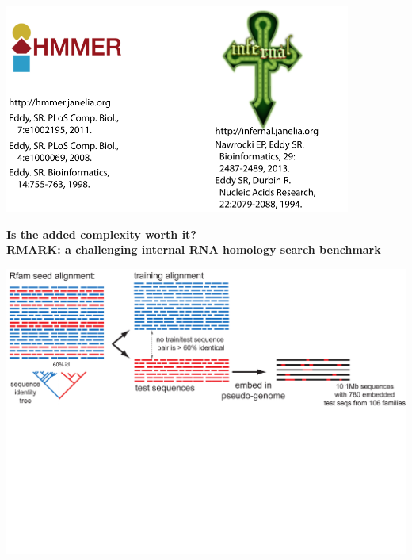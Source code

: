 \documentclass[landscape]{slides}
\begin{document}
\begin{slide}
\begin{center}
\hspace{1.8in}\includegraphics[height=2.7in]{figs/hmmer-infernal-refs-2015}

\end{center}

\vfill

\end{slide}
\begin{slide}
\begin{center}
\textbf{Is the added complexity worth it? \\
  RMARK: a challenging \underline{internal} RNA homology search
  benchmark}

\includegraphics[width=10in]{figs/rmark-tree-1}
\end{center}

\vfill
\end{slide}
\end{document}
